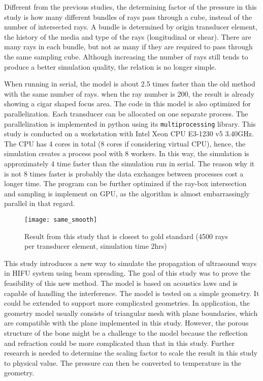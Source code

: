 
Different from the previous studies, the determining factor of the pressure in this study is how many different bundles of rays pass through a cube, instead of the number of intersected rays. A bundle is determined by origin transducer element, the history of the media and type of the rays (longitudinal or shear). There are many rays in each bundle, but not as many if they are required to pass through the same sampling cube. Although increasing the number of rays still tends to produce a better simulation quality, the relation is no longer simple.

When running in serial, the model is about 2.5 times faster than the old method with the same number of rays. when the ray number is 200, the result is already showing a cigar shaped focus area. The code in this model is also optimized for parallelization. Each transducer can be allocated on one separate process. The parallelization is implemented in python using its \texttt{multiprocessing} library. This study is conducted on a workstation with Intel\text{\textregistered} Xeon\text{\textregistered} CPU E3-1230 v5 3.40GHz. The CPU has 4 cores in total (8 cores if considering virtual CPU), hence, the simulation creates a process pool with 8 workers. In this way, the simulation is approximately 4 time faster than the simulation run in serial. The reason why it is not 8 times faster is probably the data exchanges between processes cost a longer time. The program can be further optimized if the ray-box intersection and sampling is implement on GPU, as the algorithm is almost embarrassingly parallel in that regard.

\begin{figure}[h]
    \centering
    \texttt{[image: same\_smooth]}
    \caption{Result from this study that is closest to gold standard (4500 rays  per transducer element, simulation time 2hrs)}
    \label{fig:same_smooth}
\end{figure}

This study introduces a new way to simulate the propagation of ultrasound ways in HIFU system using beam spreading. The goal of this study was to prove the feasibility of this new method. The model is based on acoustics laws and is capable of handling the interference. The model is tested on a simple geometry. It could be extended to support more complicated geometries. In application, the geometry model usually consists of triangular mesh with plane boundaries, which are compatible with the plane implemented in this study. However, the porous structure of the bone might be a challenge to the model \cite{vanwijk2013} because the reflection and refraction could be more complicated than that in this study. Further research is needed to determine the scaling factor to scale the result in this study to physical value. The pressure can then be converted to temperature in the geometry.

